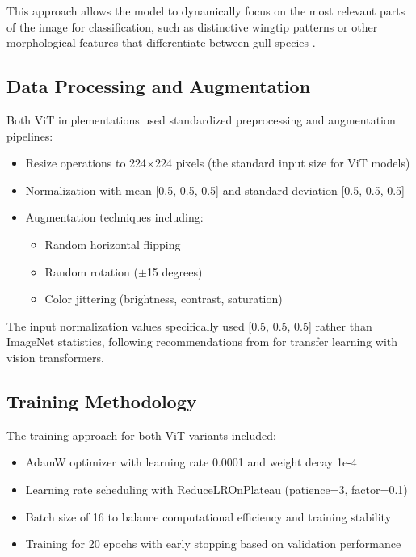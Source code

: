 \documentclass[a4paper,12pt]{article}
\begin{document}
This approach allows the model to dynamically focus on the most relevant parts of the image for classification, such as distinctive wingtip patterns or other morphological features that differentiate between gull species \citep{stassin2024explainability}.

\subsection{Data Processing and Augmentation}

Both ViT implementations used standardized preprocessing and augmentation pipelines:

\begin{itemize}
    \item Resize operations to 224$\times$224 pixels (the standard input size for ViT models)
    \item Normalization with mean [0.5, 0.5, 0.5] and standard deviation [0.5, 0.5, 0.5]
    \item Augmentation techniques including:
    \begin{itemize}
        \item Random horizontal flipping
        \item Random rotation ($\pm$15 degrees)
        \item Color jittering (brightness, contrast, saturation)
    \end{itemize}
\end{itemize}

The input normalization values specifically used [0.5, 0.5, 0.5] rather than ImageNet statistics, following recommendations from\citep{touvron2021training} for transfer learning with vision transformers.

\subsection{Training Methodology}

The training approach for both ViT variants included:

\begin{itemize}
    \item AdamW optimizer with learning rate 0.0001 and weight decay 1e-4
    \item Learning rate scheduling with ReduceLROnPlateau (patience=3, factor=0.1)
    \item Batch size of 16 to balance computational efficiency and training stability
    \item Training for 20 epochs with early stopping based on validation performance
\end{itemize}
\end{document}
